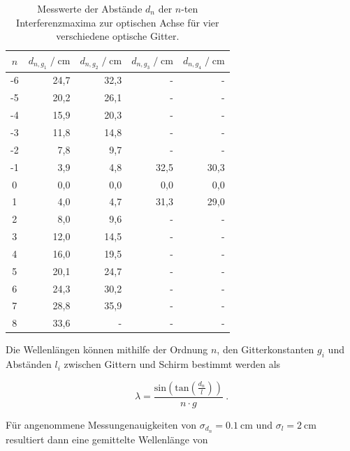 \begin{table}[H]
    \centering
    \footnotesize
    \caption{Messwerte der Abstände $d_n$ der $n$-ten Interferenzmaxima zur optischen Achse für vier verschiedene optische Gitter.}
    \label{tab:mess}
    \begin{tabular}{c | r r r r}
    \toprule
    $n$ & $d_{n,g_1} \;/\; \si{\centi\meter}$ & $d_{n,g_2} \;/\; \si{\centi\meter}$ & $d_{n,g_3} \;/\; \si{\centi\meter}$ &
    $d_{n,g_4} \;/\; \si{\centi\meter}$ \\
    \midrule
         -6 & 24,7 & 32,3 & -    & -    \\
         -5 & 20,2 & 26,1 & -    & -    \\
         -4 & 15,9 & 20,3 & -    & -    \\
         -3 & 11,8 & 14,8 & -    & -    \\
         -2 &  7,8 &  9,7 & -    & -    \\
         -1 &  3,9 &  4,8 & 32,5 & 30,3 \\
          0 &  0,0 &  0,0 &  0,0 &  0,0 \\
          1 &  4,0 &  4,7 & 31,3 & 29,0 \\
          2 &  8,0 &  9,6 & -    & -    \\
          3 & 12,0 & 14,5 & -    & -    \\
          4 & 16,0 & 19,5 & -    & -    \\
          5 & 20,1 & 24,7 & -    & -    \\
          6 & 24,3 & 30,2 & -    & -    \\
          7 & 28,8 & 35,9 & -    & -    \\
          8 & 33,6 & -    & -    & -    \\
    \bottomrule
    \end{tabular}
\end{table}

Die Wellenlängen können mithilfe der Ordnung $n$, den Gitterkonstanten $g_i$ und Abständen $l_i$
zwischen Gittern und Schirm bestimmt werden als

\vspace{-5pt}
\begin{equation}
    \lambda = \frac{\text{sin}\left(\text{tan}\left(\frac{d_n}{l}\right)\right)}{n \cdot g}\: .
\end{equation}

Für angenommene Messungenauigkeiten von $\sigma_{d_n} = \SI{0.1}{\centi\meter}$ 
und $\sigma_l = \SI{2}{\centi\meter}$
resultiert dann eine gemittelte Wellenlänge von

